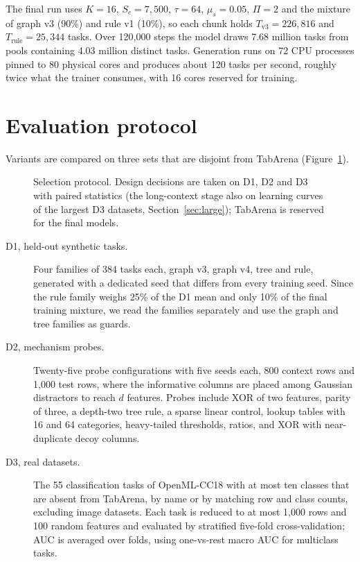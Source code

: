\documentclass[11pt]{article}
\begin{document}
The final run uses $K=16$, $S_c=7{,}500$, $\tau=64$, $\mu_s=0.05$, $\Pi=2$ and the mixture of graph
v3 (90\%) and rule v1 (10\%), so each chunk holds $T_{\mathrm{v3}}=226{,}816$ and
$T_{\mathrm{rule}}=25{,}344$ tasks. Over 120,000 steps the model draws 7.68 million tasks from pools
containing 4.03 million distinct tasks. Generation runs on 72 CPU processes pinned to 80 physical cores and produces
about 120 tasks per second, roughly twice what the trainer consumes, with 16 cores reserved for training.

\section{Evaluation protocol}
\label{sec:eval}

Variants are compared on three sets that are disjoint from TabArena (Figure~\ref{fig:protocol}).

\begin{figure}[tbp]
\centering

\caption{Selection protocol. Design decisions are taken on D1, D2 and D3 with paired statistics (the
long-context stage also on learning curves of the largest D3 datasets, Section~\ref{sec:large}); TabArena is
reserved for the final models.}
\label{fig:protocol}
\end{figure}

\begin{description}
\item[D1, held-out synthetic tasks.] Four families of 384 tasks each, graph v3, graph v4, tree and
rule, generated with a dedicated seed that differs from every training seed. Since the rule family
weighs 25\% of the D1 mean and only 10\% of the final training mixture, we read the families
separately and use the graph and tree families as guards.
\item[D2, mechanism probes.] Twenty-five probe configurations with five seeds each, 800 context rows
and 1,000 test rows, where the informative columns are placed among Gaussian distractors to reach
$d$ features. Probes include XOR of two features, parity of three, a depth-two tree rule, a sparse
linear control, lookup tables with 16 and 64 categories, heavy-tailed thresholds, ratios, and XOR
with near-duplicate decoy columns.
\item[D3, real datasets.] The 55 classification tasks of OpenML-CC18 \cite{bischl2021} with at most
ten classes that are absent from TabArena, by name or by matching row and class counts, excluding
image datasets. Each task is reduced to at most 1,000 rows and 100 random features and evaluated by
stratified five-fold cross-validation; AUC is averaged over folds, using one-vs-rest macro AUC for
multiclass tasks.
\end{description}
\end{document}

